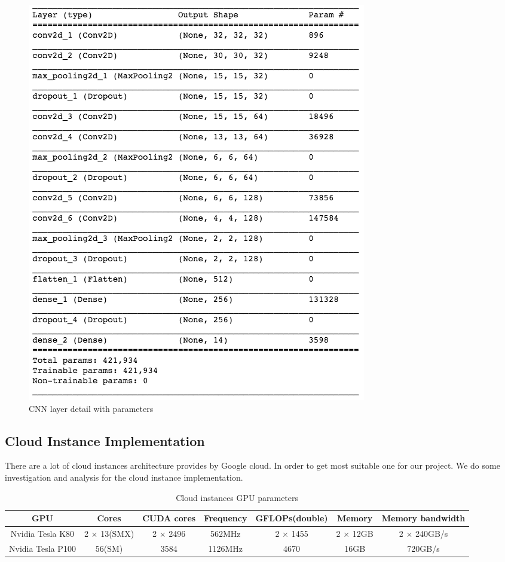 \documentclass[conference]{IEEEtran}
\begin{document}
\begin{figure}[H]
\centering
  \begin{minipage}{.4\textwidth}
    \centering
    \includegraphics[width=0.8\linewidth]{archi_param.png}
    \caption{CNN layer detail with parameters}
    \label{fig:fig_1}
  \end{minipage}
\end{figure}


\subsection{Cloud Instance Implementation}
There are a lot of cloud instances architecture provides by Google cloud. In order to get most suitable one for our project. We do some investigation and analysis for the cloud instance implementation.

\begin{table}
\caption{Cloud instances GPU parameters}
\centering
\begin{tabular}{|c|c|c|c|c|c|c|}
\hline
\textbf{GPU} & \textbf{Cores} & \textbf{CUDA cores} & \textbf{Frequency} & \textbf{GFLOPs(double)} & \textbf{Memory} & \textbf{Memory bandwidth}\\
\hline
Nvidia Tesla K80 & 2 $\times$ 13(SMX) & 2 $\times$ 2496 & 562MHz & 2 $\times$ 1455 & 2 $\times$ 12GB & 2 $\times$ 240GB/s \\
\hline
Nvidia Tesla P100 & 56(SM) & 3584 & 1126MHz & 4670 & 16GB & 720GB/s\\
\hline
\end{tabular}
\end{table}
\end{document}
